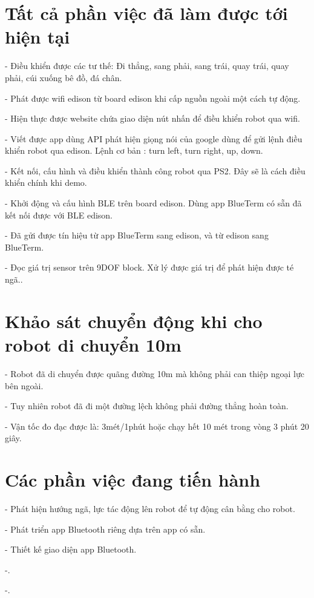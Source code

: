 \documentclass[12pt,a4paper]{article}
\begin{document}
\section{Tất cả phần việc đã làm được tới hiện tại }
\textrm{- Điều khiển được các tư thế: Đi thẳng, sang phải, sang trái, quay trái, quay phải, cúi xuống bê đồ, đá chân}.\par
\textrm{- Phát được wifi edison từ board edison khi cấp nguồn ngoài một cách tự động}.\par
\textrm{- Hiện thực được website chứa giao diện nút nhấn để điều khiển robot qua wifi}.\par
\textrm{- Viết được app dùng API phát hiện giọng nói của google dùng để gửi lệnh điều khiển robot qua edison. Lệnh cơ bản : turn left, turn right, up, down}.\par
\textrm{- Kết nối, cấu hình và điều khiển thành công robot qua PS2. Đây sẽ là cách điều khiển chính khi demo}.\par
\textrm{- Khởi động và cấu hình BLE trên board edison. Dùng app BlueTerm có sẵn đã kết nối được với BLE edison}.\par
\textrm{- Đã gửi được tín hiệu từ app BlueTerm sang edison, và từ edison sang BlueTerm}.\par
\textrm{- Đọc giá trị sensor trên 9DOF block. Xử lý được giá trị để phát hiện được té ngã.}.\par
\newpage
\newpage
\section{Khảo sát chuyển động khi cho robot di chuyển 10m }
\textrm{- Robot đã di chuyển được quãng đường 10m mà không phải can thiệp ngoại lực bên ngoài}.\par
\textrm{- Tuy nhiên robot đã đi một đường lệch không phải đường thẳng hoàn toàn}.\par
\textrm{- Vận tốc đo đạc được là: 3mét/1phút hoặc chạy hết 10 mét trong vòng 3 phút 20 giây}.\par
\newpage
\newpage
\section{Các phần việc đang tiến hành }
\textrm{- Phát hiện hướng ngã, lực tác động lên robot để tự động cân bằng cho robot}.\par
\textrm{- Phát triển app Bluetooth riêng dựa trên app có sẵn}.\par
\textrm{- Thiết kế giao diện app Bluetooth}.\par
\textrm{-}.\par
\textrm{-}.\par
\newpage
\newpage
\end{document}
